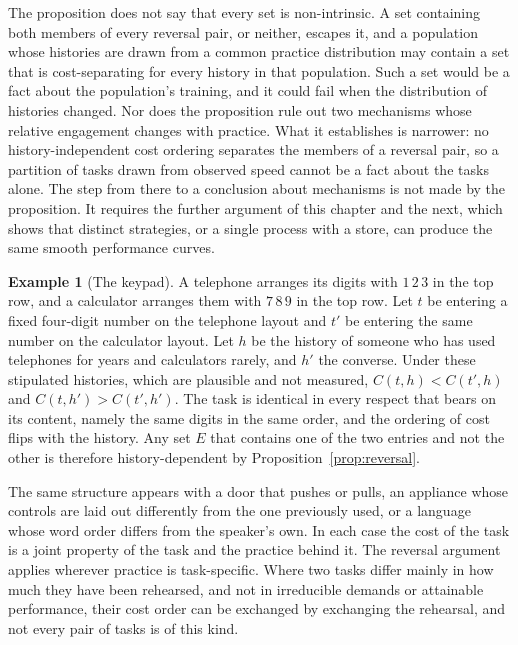 \documentclass[11pt]{report}
\theoremstyle{remark}
\theoremstyle{definition}
\newtheorem{example}{Example}[chapter]
\begin{document}
The proposition does not say that every set is non-intrinsic. A set containing both members of every reversal pair, or neither, escapes it, and a population whose histories are drawn from a common practice distribution may contain a set that is cost-separating for every history in that population. Such a set would be a fact about the population's training, and it could fail when the distribution of histories changed. Nor does the proposition rule out two mechanisms whose relative engagement changes with practice. What it establishes is narrower: no history-independent cost ordering separates the members of a reversal pair, so a partition of tasks drawn from observed speed cannot be a fact about the tasks alone. The step from there to a conclusion about mechanisms is not made by the proposition. It requires the further argument of this chapter and the next, which shows that distinct strategies, or a single process with a store, can produce the same smooth performance curves.

\begin{example}[The keypad]
A telephone arranges its digits with $1\,2\,3$ in the top row, and a calculator arranges them with $7\,8\,9$ in the top row. Let $t$ be entering a fixed four-digit number on the telephone layout and $t'$ be entering the same number on the calculator layout. Let $h$ be the history of someone who has used telephones for years and calculators rarely, and $h'$ the converse. Under these stipulated histories, which are plausible and not measured, $C(t,h)<C(t',h)$ and $C(t,h')>C(t',h')$. The task is identical in every respect that bears on its content, namely the same digits in the same order, and the ordering of cost flips with the history. Any set $E$ that contains one of the two entries and not the other is therefore history-dependent by Proposition~\ref{prop:reversal}.
\end{example}

The same structure appears with a door that pushes or pulls, an appliance whose controls are laid out differently from the one previously used, or a language whose word order differs from the speaker's own. In each case the cost of the task is a joint property of the task and the practice behind it. The reversal argument applies wherever practice is task-specific. Where two tasks differ mainly in how much they have been rehearsed, and not in irreducible demands or attainable performance, their cost order can be exchanged by exchanging the rehearsal, and not every pair of tasks is of this kind.
\end{document}

